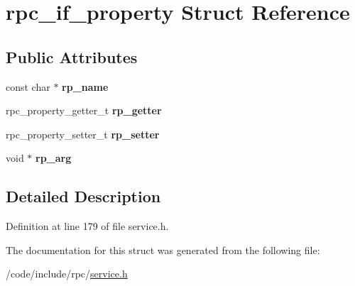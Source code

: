 \hypertarget{structrpc__if__property}{}\section{rpc\+\_\+if\+\_\+property Struct Reference}
\label{structrpc__if__property}
\subsection*{Public Attributes}
\begin{DoxyCompactItemize}
\item 
const char $\ast$ {\bfseries rp\+\_\+name}\hypertarget{structrpc__if__property_a5482e72e7b9df03cba9e3b86a4aa162c}{}\label{structrpc__if__property_a5482e72e7b9df03cba9e3b86a4aa162c}

\item 
rpc\+\_\+property\+\_\+getter\+\_\+t {\bfseries rp\+\_\+getter}\hypertarget{structrpc__if__property_a6b88200bb991311dae3c05e92dc16fdc}{}\label{structrpc__if__property_a6b88200bb991311dae3c05e92dc16fdc}

\item 
rpc\+\_\+property\+\_\+setter\+\_\+t {\bfseries rp\+\_\+setter}\hypertarget{structrpc__if__property_ab095fba7efd97b90f3440c2db5369f1e}{}\label{structrpc__if__property_ab095fba7efd97b90f3440c2db5369f1e}

\item 
void $\ast$ {\bfseries rp\+\_\+arg}\hypertarget{structrpc__if__property_a0171db6c0ee6ad206634d42de210ae52}{}\label{structrpc__if__property_a0171db6c0ee6ad206634d42de210ae52}

\end{DoxyCompactItemize}


\subsection{Detailed Description}


Definition at line 179 of file service.\+h.



The documentation for this struct was generated from the following file\+:\begin{DoxyCompactItemize}
\item 
/code/include/rpc/\hyperlink{service_8h}{service.\+h}\end{DoxyCompactItemize}
